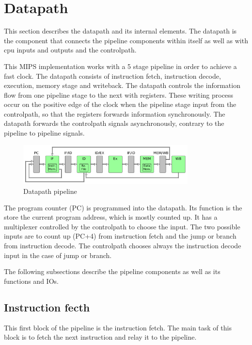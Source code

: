 \section{Datapath}
This section describes the datapath and its internal elements. The datapath is the component that connects the pipeline components within itself as well as with cpu inputs and outputs and the controlpath.

This MIPS implementation works with a 5 stage pipeline in order to achieve a fast clock. The datapath consists of instruction fetch, instruction decode, execution, memory stage and writeback.
The datapath controls the information flow from one pipeline stage to the next with registers. 
These writing process occur on the positive edge of the clock when the pipeline stage input from the controlpath, so that the registers forwards information synchronously. 
The datapath forwards the controlpath signals asynchronously, contrary to the pipeline to pipeline signals.



\begin{figure}[h!]
  \centering
  \includegraphics[width=0.8\textwidth]{figure/datapath.png}
  \caption{Datapath pipeline}
  \label{fig:datapath}
\end{figure}

The program counter (PC) is programmed into the datapath. Its function is the store the current program address, which is mostly counted up.
It has a multiplexer controlled by the controlpath to choose the input. The two possible inputs are to count up (PC+4) from instruction fetch
and the jump or branch from instruction decode. The controlpath chooses always the instruction decode input in the case of jump or branch. 


The following subsections describe the pipeline components as well as its functions and IOs. 

\subsection{Instruction fecth}
This first block of the pipeline is the instruction fetch. The main task of this block is to fetch the next instruction and relay it to the pipeline. 

